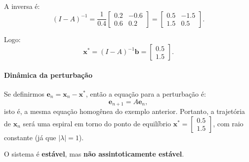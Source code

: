 \documentclass{article}
\begin{document}
A inversa é:
\[
(I - A)^{-1} = \frac{1}{0.4} \begin{bmatrix}
0.2 & -0.6 \\
0.6 & 0.2
\end{bmatrix}
= \begin{bmatrix}
0.5 & -1.5 \\
1.5 & 0.5
\end{bmatrix}.
\]

Logo:
\[
\bm{x}^* = (I - A)^{-1} \bm{b} =
\begin{bmatrix}
0.5 \\
1.5
\end{bmatrix}.
\]

\paragraph{Dinâmica da perturbação} Se definirmos
$\bm{e}_n = \bm{x}_n - \bm{x}^*$, então a equação para a perturbação é:
\[
\bm{e}_{n+1} = A \bm{e}_n,
\]
isto é, a mesma equação homogênea do exemplo anterior. Portanto, a
trajetória de $\bm{x}_n$ será uma espiral em torno do ponto de
equilíbrio $\bm{x}^* = \begin{bmatrix} 0.5 \\ 1.5 \end{bmatrix}$, com
raio constante (já que $|\lambda| = 1$).

\begin{center}
\end{center}

 O sistema é \textbf{estável}, mas \textbf{não assintoticamente estável}.
\end{document}
